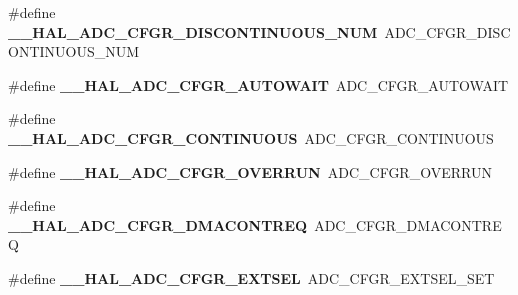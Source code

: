 \begin{DoxyCompactItemize}
\item 
\hypertarget{group___h_a_l___a_d_c___aliased___macros_ga6c152cf129addeff1a7f296fa89b04af}{\#define {\bfseries \-\_\-\-\_\-\-H\-A\-L\-\_\-\-A\-D\-C\-\_\-\-C\-F\-G\-R\-\_\-\-D\-I\-S\-C\-O\-N\-T\-I\-N\-U\-O\-U\-S\-\_\-\-N\-U\-M}~A\-D\-C\-\_\-\-C\-F\-G\-R\-\_\-\-D\-I\-S\-C\-O\-N\-T\-I\-N\-U\-O\-U\-S\-\_\-\-N\-U\-M}\label{group___h_a_l___a_d_c___aliased___macros_ga6c152cf129addeff1a7f296fa89b04af}

\item 
\hypertarget{group___h_a_l___a_d_c___aliased___macros_ga2b6be3d51e5b71511f3db77d6781fc85}{\#define {\bfseries \-\_\-\-\_\-\-H\-A\-L\-\_\-\-A\-D\-C\-\_\-\-C\-F\-G\-R\-\_\-\-A\-U\-T\-O\-W\-A\-I\-T}~A\-D\-C\-\_\-\-C\-F\-G\-R\-\_\-\-A\-U\-T\-O\-W\-A\-I\-T}\label{group___h_a_l___a_d_c___aliased___macros_ga2b6be3d51e5b71511f3db77d6781fc85}

\item 
\hypertarget{group___h_a_l___a_d_c___aliased___macros_gab45f96be007a67f1251d47410b5c9618}{\#define {\bfseries \-\_\-\-\_\-\-H\-A\-L\-\_\-\-A\-D\-C\-\_\-\-C\-F\-G\-R\-\_\-\-C\-O\-N\-T\-I\-N\-U\-O\-U\-S}~A\-D\-C\-\_\-\-C\-F\-G\-R\-\_\-\-C\-O\-N\-T\-I\-N\-U\-O\-U\-S}\label{group___h_a_l___a_d_c___aliased___macros_gab45f96be007a67f1251d47410b5c9618}

\item 
\hypertarget{group___h_a_l___a_d_c___aliased___macros_ga4312a4ed4373cdd0302434574aa0c8c9}{\#define {\bfseries \-\_\-\-\_\-\-H\-A\-L\-\_\-\-A\-D\-C\-\_\-\-C\-F\-G\-R\-\_\-\-O\-V\-E\-R\-R\-U\-N}~A\-D\-C\-\_\-\-C\-F\-G\-R\-\_\-\-O\-V\-E\-R\-R\-U\-N}\label{group___h_a_l___a_d_c___aliased___macros_ga4312a4ed4373cdd0302434574aa0c8c9}

\item 
\hypertarget{group___h_a_l___a_d_c___aliased___macros_gaa80ebf8b334aa3e040d153ec06c880e2}{\#define {\bfseries \-\_\-\-\_\-\-H\-A\-L\-\_\-\-A\-D\-C\-\_\-\-C\-F\-G\-R\-\_\-\-D\-M\-A\-C\-O\-N\-T\-R\-E\-Q}~A\-D\-C\-\_\-\-C\-F\-G\-R\-\_\-\-D\-M\-A\-C\-O\-N\-T\-R\-E\-Q}\label{group___h_a_l___a_d_c___aliased___macros_gaa80ebf8b334aa3e040d153ec06c880e2}

\item 
\hypertarget{group___h_a_l___a_d_c___aliased___macros_gacc58e207b5fcc238afb480a00997d167}{\#define {\bfseries \-\_\-\-\_\-\-H\-A\-L\-\_\-\-A\-D\-C\-\_\-\-C\-F\-G\-R\-\_\-\-E\-X\-T\-S\-E\-L}~A\-D\-C\-\_\-\-C\-F\-G\-R\-\_\-\-E\-X\-T\-S\-E\-L\-\_\-\-S\-E\-T}\label{group___h_a_l___a_d_c___aliased___macros_gacc58e207b5fcc238afb480a00997d167}


\end{DoxyCompactItemize}
